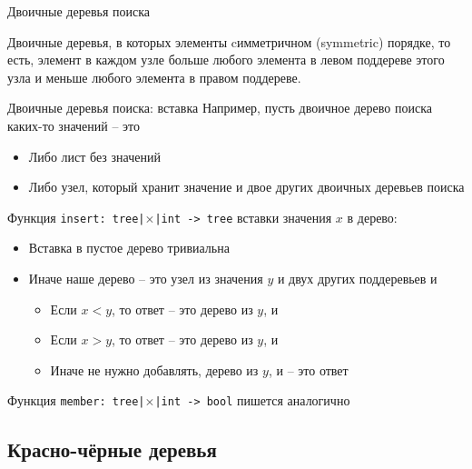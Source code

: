 \begin{frame}{Двоичные деревья поиска}
\begin{definition}
Двоичные деревья, в которых элементы cимметричном
 (symmetric) порядке, то есть, элемент в каждом узле больше любого элемента в левом поддереве
этого узла и меньше любого элемента в правом поддереве. 
\end{definition}
\end{frame}

\begin{frame}{Двоичные деревья поиска: вставка}
Например, пусть двоичное дерево поиска каких-то значений -- это 
\begin{itemize}
\item Либо лист без значений
\item Либо узел, который хранит значение и двое других двоичных деревьев поиска
\end{itemize}
\vspace{1em}

Функция \texttt{insert: tree|$\times$|int -> tree} вставки значения $x$ в дерево:
\begin{itemize}
\item Вставка в пустое дерево тривиальна
\item Иначе наше дерево -- это узел из значения $y$ и двух других поддеревьев  и 
\begin{itemize}
\item Если $x<y$, то ответ -- это дерево из $y$,  и 
\item Если $x>y$, то ответ -- это дерево из $y$,  и  
\item Иначе не нужно добавлять, дерево из $y$,  и  -- это ответ
\end{itemize}
\end{itemize}
\vspace{2em}
Функция \texttt{member: tree|$\times$|int -> bool} пишется аналогично
\end{frame}

%






\subsection{Красно-чёрные деревья}

